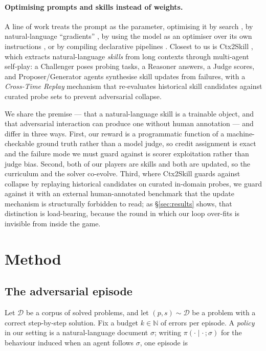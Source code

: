 \documentclass{article} %
\begin{document}
\paragraph{Optimising prompts and skills instead of weights.}
A line of work treats the prompt as the parameter, optimising it by search
\citep{zhou2023large}, by natural-language ``gradients'' \citep{pryzant2023automatic}, by
using the model as an optimiser over its own instructions \citep{yang2024large}, or by
compiling declarative pipelines \citep{khattab2024dspy}. Closest to us is
Ctx2Skill \citep{si2026context}, which extracts natural-language \emph{skills} from long
contexts through multi-agent self-play: a Challenger poses probing tasks, a Reasoner
answers, a Judge scores, and Proposer/Generator agents synthesise skill updates from
failures, with a \emph{Cross-Time Replay} mechanism that re-evaluates historical skill
candidates against curated probe sets to prevent adversarial collapse.

We share the premise --- that a natural-language skill is a trainable object, and that
adversarial interaction can produce one without human annotation --- and differ in three
ways. First, our reward is a programmatic function of a machine-checkable ground truth
rather than a model judge, so credit assignment is exact and the failure mode we must guard
against is scorer exploitation rather than judge bias. Second, both of our players are
skills and both are updated, so the curriculum and the solver co-evolve. Third, where
Ctx2Skill guards against collapse by replaying historical candidates on curated in-domain
probes, we guard against it with an external human-annotated benchmark that the update
mechanism is structurally forbidden to read; as \S\ref{sec:results} shows, that distinction
is load-bearing, because the round in which our loop over-fits is invisible from inside the
game.

\section{Method}
\label{sec:method}

\subsection{The adversarial episode}

Let $\mathcal{D}$ be a corpus of solved problems, and let $(p, s) \sim \mathcal{D}$ be a
problem with a correct step-by-step solution. Fix a budget $k \in \mathbb{N}$ of errors per
episode. A \emph{policy} in our setting is a natural-language document $\sigma$; writing
$\pi(\cdot \mid \cdot\,; \sigma)$ for the behaviour induced when an agent follows $\sigma$,
one episode is
\end{document}
